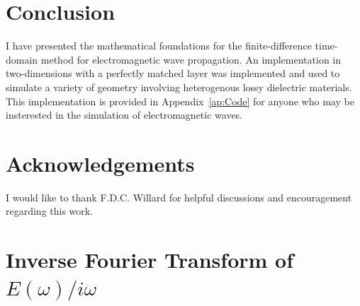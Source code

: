 \documentclass[12pt]{article}
\begin{document}
\begin{multicols}{2}
\section{Conclusion}
I have presented the mathematical foundations for the finite-difference time-domain method for electromagnetic wave propagation. An implementation in two-dimensions with a perfectly matched layer was implemented and used to simulate a variety of geometry involving heterogenous lossy dielectric materials. This implementation is provided in Appendix~\ref{ap:Code} for anyone who may be insterested in the simulation of electromagnetic waves.
\section*{Acknowledgements}
I would like to thank F.D.C. Willard for helpful discussions and encouragement regarding this work.



\newpage
\end{multicols}
\appendix
\section{Inverse Fourier Transform of $E(\omega)/i\omega$}
\label{ap:fourier1}
\end{document}
